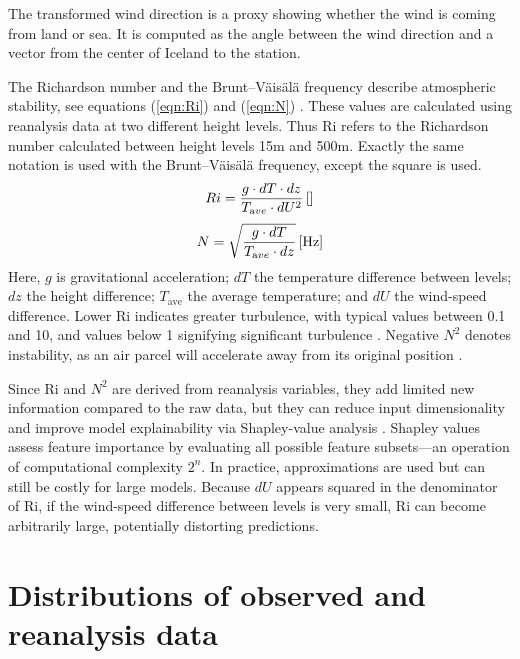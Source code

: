 The transformed wind direction is a proxy showing whether the wind is coming from land or sea. It is computed as the angle between the wind direction and a vector from the center of Iceland to the station.

The Richardson number and the Brunt–Väisälä frequency describe atmospheric stability, see equations (\ref{eqn:Ri}) and (\ref{eqn:N})  \cite{richardson_number_skybrary,brunt_vaisala_freq_eumtrain,mean_gust_HA_HO}. These values are calculated using reanalysis data at two different height levels. Thus Ri refers to the Richardson number calculated between height levels 15m and 500m. Exactly the same notation is used with the Brunt–Väisälä frequency, except the square is used.
%
\begin{equation}
  \label{eqn:Ri}
  Ri = \frac{g \cdot dT \cdot dz}{T_{\textrm ave} \cdot dU^2} \, \mathrm{[]}
\end{equation}
%
\begin{equation}
  \label{eqn:N}
  N = \sqrt{\frac{g \cdot dT }{T_{\textrm ave} \cdot dz}} \, \mathrm{[Hz]}
\end{equation}
%
Here, $g$ is gravitational acceleration; $dT$ the temperature difference between levels; $dz$ the height difference; $T_{\mathrm{ave}}$ the average temperature; and $dU$ the wind-speed difference. Lower Ri indicates greater turbulence, with typical values between 0.1 and 10, and values below 1 signifying significant turbulence \cite{richardson_number_skybrary}. Negative $N^2$ denotes instability, as an air parcel will accelerate away from its original position \cite{brunt_vaisala_freq_eumtrain}.

Since Ri and $N^2$ are derived from reanalysis variables, they add limited new information compared to the raw data, but they can reduce input dimensionality and improve model explainability via Shapley-value analysis \cite{shapley_information}. Shapley values assess feature importance by evaluating all possible feature subsets—an operation of computational complexity $2^n$. In practice, approximations are used but can still be costly for large models. Because $dU$ appears squared in the denominator of Ri, if the wind-speed difference between levels is very small, Ri can become arbitrarily large, potentially distorting predictions.

\section{Distributions of observed and reanalysis data}

